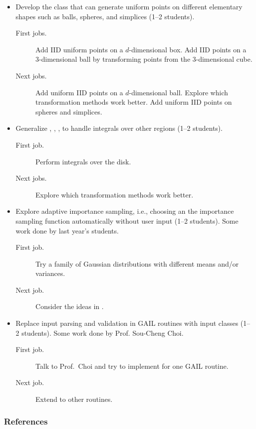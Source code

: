 \documentclass[10pt,compress,xcolor={usenames,dvipsnames}]{beamer} %
\begin{document}
\begin{frame}[allowframebreaks]
\begin{itemize}
\item Develop the class  that can generate uniform points on different elementary shapes such as balls, spheres, and simplices (1--2 students). 
\begin{description}
\item[First jobs.] Add IID uniform points on a $d$-dimensional box.  \newline Add IID points on a 3-dimensional ball by transforming points from the 3-dimensional cube.
\item[Next jobs.] Add uniform IID points on a $d$-dimensional ball. \newline Explore which transformation methods work better. \newline
Add uniform IID points on spheres and simplices.
\end{description}

\pagebreak

\item Generalize , , , to handle integrals over other regions (1--2 students).
\begin{description}
\item[First job.] Perform integrals over the disk.
\item[Next jobs.]  Explore which transformation methods work better. 
\end{description}


\item Explore adaptive importance sampling, i.e., choosing an the importance sampling function automatically without user input (1--2 students).  Some work done by last year's students.
\begin{description}
\item[First job.] Try a family of Gaussian distributions with different means and/or variances.
\item[Next job.] Consider the ideas in .
\end{description}

\item Replace input parsing and validation in GAIL routines with input classes (1--2 students).  Some work done by Prof. Sou-Cheng Choi.
\begin{description}
	\item[First job.] Talk to Prof.\ Choi and try to implement for one GAIL routine.
	\item[Next job.] Extend to other routines.
\end{description}

\end{itemize}
\end{frame}


\begin{frame}\frametitle{References}

\end{frame}
\end{document}
